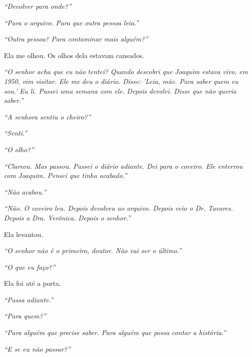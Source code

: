 \noindent \textit{\textquotedblleft{}Devolver para onde?\textquotedblright{}}

\noindent \textit{\textquotedblleft{}Para o arquivo. Para que outra pessoa leia.\textquotedblright{}}

\noindent \textit{\textquotedblleft{}Outra pessoa? Para contaminar mais alguém?\textquotedblright{}}

\noindent Ela me olhou. Os olhos dela estavam cansados.

\noindent \textit{\textquotedblleft{}O senhor acha que eu não tentei? Quando descobri que Joaquim estava vivo, em 1950, vim visitar. Ele me deu o diário. Disse: 'Leia, mãe. Para saber quem eu sou.' Eu li. Passei uma semana com ele. Depois devolvi. Disse que não queria saber.\textquotedblright{}}

\noindent \textit{\textquotedblleft{}A senhora sentiu o cheiro?\textquotedblright{}}

\noindent \textit{\textquotedblleft{}Senti.\textquotedblright{}}

\noindent \textit{\textquotedblleft{}O olho?\textquotedblright{}}

\noindent \textit{\textquotedblleft{}Clareou. Mas passou. Passei o diário adiante. Dei para o coveiro. Ele enterrou com Joaquim. Pensei que tinha acabado.\textquotedblright{}}

\noindent \textit{\textquotedblleft{}Não acabou.\textquotedblright{}}

\noindent \textit{\textquotedblleft{}Não. O coveiro leu. Depois devolveu ao arquivo. Depois veio o Dr. Tavares. Depois a Dra. Verônica. Depois o senhor.\textquotedblright{}}

\noindent Ela levantou.

\noindent \textit{\textquotedblleft{}O senhor não é o primeiro, doutor. Não vai ser o último.\textquotedblright{}}

\noindent \textit{\textquotedblleft{}O que eu faço?\textquotedblright{}}

\noindent Ela foi até a porta.

\noindent \textit{\textquotedblleft{}Passa adiante.\textquotedblright{}}

\noindent \textit{\textquotedblleft{}Para quem?\textquotedblright{}}

\noindent \textit{\textquotedblleft{}Para alguém que precise saber. Para alguém que possa contar a história.\textquotedblright{}}

\noindent \textit{\textquotedblleft{}E se eu não passar?\textquotedblright{}}

